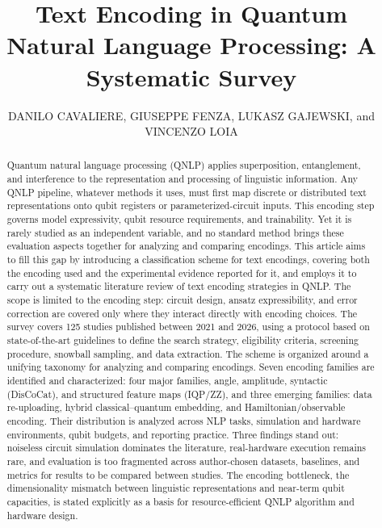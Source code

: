 \documentclass{ieeeaccess}
\begin{document}
 
\title{Text Encoding in Quantum Natural Language Processing: A Systematic Survey}

\author{\uppercase{Danilo Cavaliere}, \uppercase{Giuseppe Fenza}, \uppercase{Lukasz Gajewski}, and \uppercase{Vincenzo Loia}}

\address[1]{Department of Management \& Innovation Systems, Università degli Studi di Salerno, Italy}



\begin{abstract}
Quantum natural language processing (QNLP) applies superposition, entanglement, and interference to the representation and processing of linguistic information. Any QNLP pipeline, whatever methods it uses, must first map discrete or distributed text representations onto qubit registers or parameterized-circuit inputs. This encoding step governs model expressivity, qubit resource requirements, and trainability. Yet it is rarely studied as an independent variable, and no standard method brings these evaluation aspects together for analyzing and comparing encodings. This article aims to fill this gap by introducing a classification scheme for text encodings, covering both the encoding used and the experimental evidence reported for it, and employs it to carry out a systematic literature review of text encoding strategies in QNLP. The scope is limited to the encoding step: circuit design, ansatz expressibility, and error correction are covered only where they interact directly with encoding choices. The survey covers 125 studies published between 2021 and 2026, using a protocol based on state-of-the-art guidelines to define the search strategy, eligibility criteria, screening procedure, snowball sampling, and data extraction. The scheme is organized around a unifying taxonomy for analyzing and comparing encodings. Seven encoding families are identified and characterized: four major families, angle, amplitude, syntactic (DisCoCat), and structured feature maps (IQP/ZZ), and three emerging families: data re-uploading, hybrid classical--quantum embedding, and Hamiltonian/observable encoding. Their distribution is analyzed across NLP tasks, simulation and hardware environments, qubit budgets, and reporting practice. Three findings stand out: noiseless circuit simulation dominates the literature, real-hardware execution remains rare, and evaluation is too fragmented across author-chosen datasets, baselines, and metrics for results to be compared between studies. The encoding bottleneck, the dimensionality mismatch between linguistic representations and near-term qubit capacities, is stated explicitly as a basis for resource-efficient QNLP algorithm and hardware design.
\end{abstract}
\end{document}
